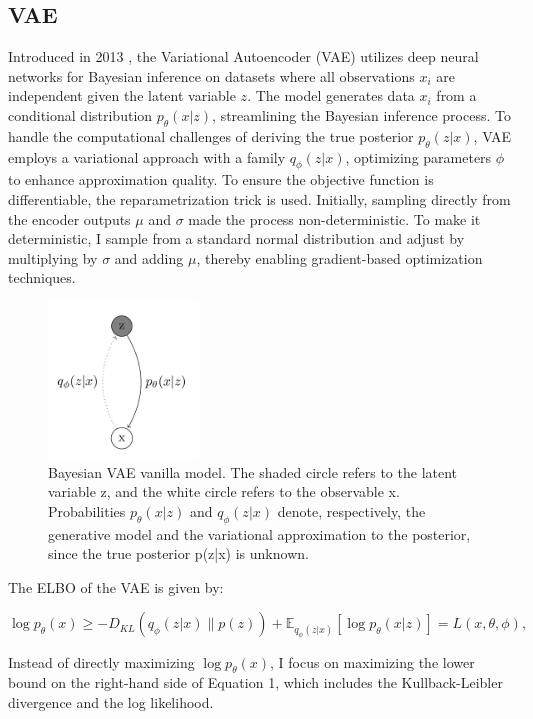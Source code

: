 \documentclass{article}
\begin{document}
\subsection{VAE}
Introduced in 2013 \cite{kingma2013auto}, the Variational Autoencoder (VAE) utilizes deep neural networks for Bayesian inference on datasets where all observations \(x_i\) are independent given the latent variable \(z\). The model generates data \(x_i\) from a conditional distribution \(p_\theta(x|z)\), streamlining the Bayesian inference process. To handle the computational challenges of deriving the true posterior \(p_\theta(z|x)\), VAE employs a variational approach with a family \(q_\phi(z|x)\), optimizing parameters \(\phi\) to enhance approximation quality. To ensure the objective function is differentiable, the reparametrization trick is used. Initially, sampling directly from the encoder outputs \(\mu\) and \(\sigma\) made the process non-deterministic. To make it deterministic,  I sample from a standard normal distribution and adjust by multiplying by \(\sigma\) and adding \(\mu\), thereby enabling gradient-based optimization techniques.

\begin{figure}[H]
    \centering
    \includegraphics[width=4cm]{figures/VAE.png}
    \caption{Bayesian VAE vanilla model. The shaded circle refers to the latent variable z, and the white circle refers to the observable x. Probabilities \(p_\theta(x|z)\) and \(q_\phi(z|x)\) denote, respectively, the generative model and the variational approximation to the posterior, since the true posterior p(z|x) is unknown.}
    \label{VAE}
\end{figure}

The ELBO of the VAE is given by:

\begin{equation}
    \log p_\theta(x) \geq -D_{KL}(q_\phi(z|x) \parallel p(z)) + \mathbb{E}_{q_\phi(z|x)}[\log p_\theta(x|z)] = L(x, \theta, \phi),
\end{equation}

Instead of directly maximizing \(\log p_\theta(x)\), I focus on maximizing the lower bound on the right-hand side of Equation 1, which includes the Kullback-Leibler divergence and the log likelihood.
\end{document}
